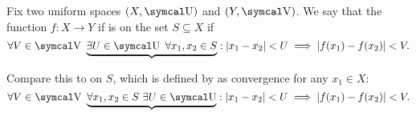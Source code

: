 \begin{definition}\label{def:uniform_continuity}\cite[435]{Engelking1989}
  Fix two uniform spaces \( (X, \CU) \) and \( (Y, \CV) \). We say that the function \( f: X \to Y \) if is  on the set \( S \subseteq X \) if
  \begin{equation}\label{def:uniform_continuity/uniform}
    \forall V \in \CV \ \underbrace{\exists U \in \CU \ \forall x_1, x_2 \in S} : \Abs{x_1 - x_2} < U \implies \Abs{f(x_1) - f(x_2)} < V.
  \end{equation}

  Compare this to  on \( S \), which is defined by  as convergence for any \( x_1 \in X \):
  \begin{equation}\label{def:uniform_continuity/pointwise}
    \forall V \in \CV \ \underbrace{\forall x_1, x_2 \in S \ \exists U \in \CU} : \Abs{x_1 - x_2} < U \implies \Abs{f(x_1) - f(x_2)} < V.
  \end{equation}
\end{definition}

